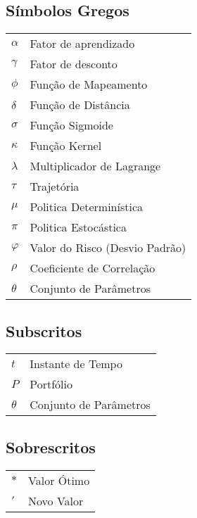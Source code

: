 \subsection*{Símbolos Gregos}

\begin{tabular}{p{}p{}}
$\alpha$ & Fator de aprendizado \\
$\gamma$ & Fator de desconto \\
$\phi$ & Função de Mapeamento \\
$\delta$ & Função de Distância \\
$\sigma$ & Função Sigmoide \\
$\kappa$ & Função Kernel \\
$\lambda$ & Multiplicador de Lagrange \\
$\tau$ & Trajetória \\
$\mu$ & Politica Determinística \\
$\pi$ & Politica Estocástica \\
$\varphi$ & Valor do Risco (Desvio Padrão) \\
$\rho$ & Coeficiente de Correlação \\
$\theta$ & Conjunto de Parâmetros \\
\end{tabular}

\subsection*{Subscritos}

\begin{tabular}{p{}p{}}
$t$ & Instante de Tempo \\
$P$ & Portfólio \\
$\theta$ & Conjunto de Parâmetros 
\end{tabular}

\subsection*{Sobrescritos}

\begin{tabular}{p{}p{}}
$*$ & Valor Ótimo \\
$'$ & Novo Valor \\
\end{tabular}
